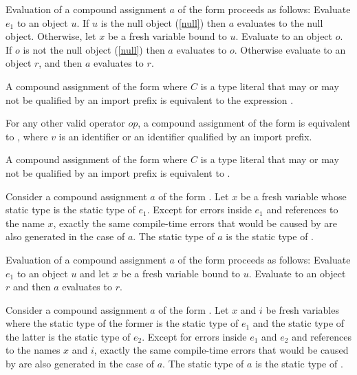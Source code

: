 \documentclass[makeidx]{article}
\begin{document}
{\LMHash{}%
Evaluation of a compound assignment $a$ of the form 
proceeds as follows:
Evaluate $e_1$ to an object $u$.
If $u$ is the null object (\ref{null}) then $a$ evaluates to the null object.
Otherwise, let $x$ be a fresh variable bound to $u$.
Evaluate  to an object $o$.
If $o$ is not the null object (\ref{null}) then $a$ evaluates to $o$.
Otherwise evaluate  to an object $r$,
and then $a$ evaluates to $r$.
\EndCase

\LMHash{}%
A compound assignment of the form 
where $C$ is a type literal
that may or may not be qualified by an import prefix
is equivalent to the expression .
\EndCase

\LMHash{}%
For any other valid operator $op$,
a compound assignment of the form 
is equivalent to ,
where $v$ is an identifier or an identifier qualified by an import prefix.
\EndCase

\LMHash{}%
A compound assignment of the form 
where $C$ is a type literal
that may or may not be qualified by an import prefix
is equivalent to .
\EndCase

\LMHash{}%
Consider a compound assignment $a$ of the form .
Let $x$ be a fresh variable whose static type is the static type of $e_1$.
Except for errors inside $e_1$ and references to the name $x$,
exactly the same compile-time errors that would be caused by
are also generated in the case of $a$.
The static type of $a$ is the static type of .

\LMHash{}%
Evaluation of a compound assignment $a$ of the form 
proceeds as follows:
Evaluate $e_1$ to an object $u$ and let $x$ be a fresh variable bound to $u$.
Evaluate  to an object $r$
and then $a$ evaluates to $r$.
\EndCase

\LMHash{}%
Consider a compound assignment $a$ of the form .
Let $x$ and $i$ be fresh variables
where the static type of the former is the static type of $e_1$
and the static type of the latter is the static type of $e_2$.
Except for errors inside $e_1$ and $e_2$ and references to
the names $x$ and $i$,
exactly the same compile-time errors that would be caused by
are also generated in the case of $a$.
The static type of $a$ is the static type of .

}
\end{document}
